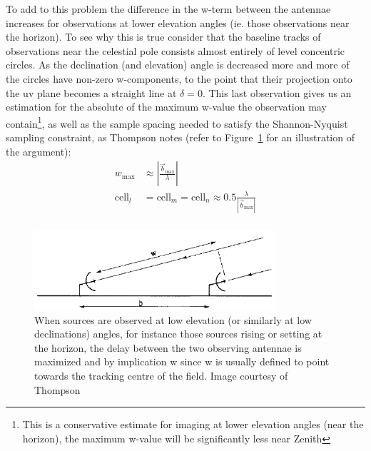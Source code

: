 To add to this problem the difference in the w-term between the antennae increases for observations at lower elevation angles (ie. those observations near the horizon). To see why this
is true consider that the baseline tracks of observations near the celestial pole consists almost entirely of level concentric circles. As the declination (and elevation) angle is decreased 
more and more of the circles have non-zero w-components, to the point that their projection onto the uv plane becomes a straight line at $\delta=0$. This last observation
gives us an estimation for the absolute of the maximum w-value the observation may contain\footnote{This is a conservative estimate for imaging at lower elevation angles (near the horizon),
the maximum w-value will be significantly less near Zenith}, as well as the sample spacing needed to satisfy the Shannon-Nyquist sampling constraint, 
as Thompson \cite[Lecture 2]{taylor1999synthesis} notes (refer to Figure~\ref{fig_max_baseline} for an illustration of the argument):
\begin{equation}
 \label{eqn_wmax}
 \begin{split}
  w_{\text{max}} &\approx |\frac{\vec{b}_{\text{max}}}{\lambda}|\\
  \text{cell}_l &= \text{cell}_m = \text{cell}_n \approx 0.5\frac{\lambda}{|\vec{b}_{\text{max}}|}\\
 \end{split}
\end{equation}

\begin{figure}[h!]
  \begin{mdframed}
    \centering
    \includegraphics[width=0.8\textwidth]{images/max_w.png}
    \caption[Maximum w-estimation at low azimuth angle observation]{When sources are observed at low elevation (or similarly at low declinations) angles,
    for instance those sources rising or setting at the horizon, the delay between the two observing antennae is maximized and by implication w since w is usually
    defined to point towards the tracking centre of the field. Image courtesy of Thompson \cite[Lecture 2]{taylor1999synthesis}}
    \label{fig_max_baseline}
  \end{mdframed}
\end{figure}

